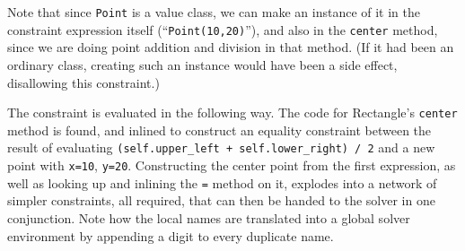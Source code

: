 \documentclass{article}
\begin{document}
Note that since \verb|Point| is a value class, we can make an instance
of it in the constraint expression itself (``\verb|Point(10,20)|''),
and also in the \verb|center| method, since we are doing point
addition and division in that method.  (If it had been an ordinary
class, creating such an instance would have been a side effect,
disallowing this constraint.)

The constraint is evaluated in the following way.  The code for
Rectangle's \verb|center| method is found, and inlined to construct an
equality constraint between the result of evaluating
\verb|(self.upper_left + self.lower_right) / 2| and a new point with
\verb|x=10|, \verb|y=20|. Constructing the center point from the first
expression, as well as looking up and inlining the \verb|=| method on
it, explodes into a network of simpler constraints, all required, that
can then be handed to the solver in one conjunction. Note how the
local names are translated into a global solver environment by
appending a digit to every duplicate name.

\ifx\hpitr\undefined
\newcommand{\mycskip}{\hspace{29em}}
\else
\newcommand{\mycskip}{\hspace{17em}}
\fi
\end{document}
